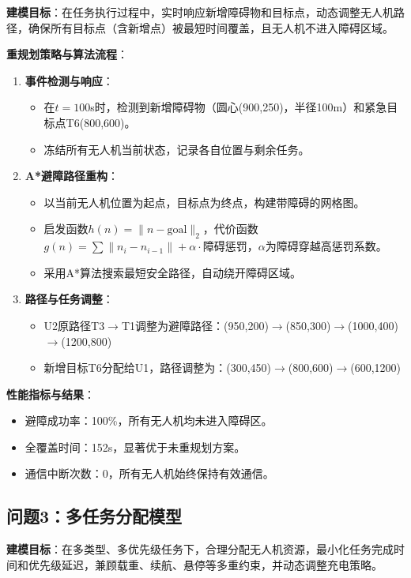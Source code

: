 \documentclass[12pt,fontset=adobe]{ctexart}
\begin{document}
\textbf{建模目标}：在任务执行过程中，实时响应新增障碍物和目标点，动态调整无人机路径，确保所有目标点（含新增点）被最短时间覆盖，且无人机不进入障碍区域。

\textbf{重规划策略与算法流程}：
\begin{enumerate}
  \item \textbf{事件检测与响应}：
    \begin{itemize}
      \item 在$t=100$s时，检测到新增障碍物（圆心(900,250)，半径100m）和紧急目标点T6(800,600)。
      \item 冻结所有无人机当前状态，记录各自位置与剩余任务。
    \end{itemize}
  \item \textbf{A*避障路径重构}：
    \begin{itemize}
      \item 以当前无人机位置为起点，目标点为终点，构建带障碍的网格图。
      \item 启发函数$h(n) = \|n-\text{goal}\|_2$，代价函数$g(n) = \sum \|n_i-n_{i-1}\| + \alpha \cdot \text{障碍惩罚}$，$\alpha$为障碍穿越高惩罚系数。
      \item 采用A*算法搜索最短安全路径，自动绕开障碍区域。
    \end{itemize}
  \item \textbf{路径与任务调整}：
    \begin{itemize}
      \item U2原路径T3$\to$T1调整为避障路径：(950,200)$\to$(850,300)$\to$(1000,400)$\to$(1200,800)
      \item 新增目标T6分配给U1，路径调整为：(300,450)$\to$(800,600)$\to$(600,1200)
    \end{itemize}
\end{enumerate}

\textbf{性能指标与结果}：
\begin{itemize}
  \item 避障成功率：100\%，所有无人机均未进入障碍区。
  \item 全覆盖时间：152s，显著优于未重规划方案。
  \item 通信中断次数：0，所有无人机始终保持有效通信。
\end{itemize}

\subsection{问题3：多任务分配模型}

\textbf{建模目标}：在多类型、多优先级任务下，合理分配无人机资源，最小化任务完成时间和优先级延迟，兼顾载重、续航、悬停等多重约束，并动态调整充电策略。
\end{document}
